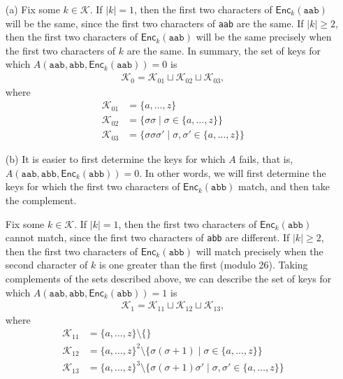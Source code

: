 \documentclass[12pt]{article}
\numberwithin{equation}{section}
\theoremstyle{plain}
\newcommand{\set}[1]{\{ #1 \}}
\newcommand{\keys}{\mathcal{K}}
\newcommand{\algo}[1]{\mathsf{#1}}
\newcommand{\enc}{\algo{Enc}}
\begin{document}
\begin{enumerate}
    \item[(a)] Fix some $k \in \keys$.
    If $|k| = 1$,
    then the first two characters of $\enc_{k}(\texttt{aab})$ will be the same,
    since the first two characters of \texttt{aab} are the same.
    If $|k| \geq 2$,
    then the first two characters of $\enc_{k}(\texttt{aab})$ will be the same
    precisely when the first two characters of $k$ are the same.
    In summary, the set of keys for which $A(\texttt{aab}, \texttt{abb}, \enc_{k}(\texttt{aab})) = 0$ is
    \begin{gather*}
        \keys_0 = \keys_{01} \sqcup \keys_{02} \sqcup \keys_{03},
    \end{gather*}
    where
    \begin{align*}
        \keys_{01} &= \set{ a, \ldots, z }\\
        \keys_{02} &= \set{ \sigma \sigma \mid \sigma \in \set{ a, \ldots, z } }\\
        \keys_{03} &= \set{ \sigma \sigma \sigma' \mid \sigma, \sigma' \in \set{ a, \ldots, z } }
    \end{align*}

    \item[(b)] It is easier to first determine the keys for which $A$ fails,
    that is, $A(\texttt{aab}, \texttt{abb}, \enc_{k}(\texttt{abb})) = 0$.
    In other words, we will first determine the keys for which
    the first two characters of $\enc_{k}(\texttt{abb})$ match,
    and then take the complement.

    Fix some $k \in \keys$.
    If $|k| = 1$,
    then the first two characters of $\enc_{k}(\texttt{abb})$ cannot match,
    since the first two characters of \texttt{abb} are different.
    If $|k| \geq 2$,
    then the first two characters of $\enc_{k}(\texttt{abb})$ will match
    precisely when the second character of $k$ is one greater than the first (modulo 26).
    Taking complements of the sets described above,
    we can describe the set of keys for which $A(\texttt{aab}, \texttt{abb}, \enc_{k}(\texttt{abb})) = 1$ is
    \begin{gather*}
        \keys_1 = \keys_{11} \sqcup \keys_{12} \sqcup \keys_{13},
    \end{gather*}
    where
    \begin{align*}
        \keys_{11} &= \set{ a, \ldots, z } \setminus \set{ }\\
        \keys_{12} &= \set{ a, \ldots, z }^2 \setminus \set{ \sigma(\sigma+1) \mid \sigma \in \set{ a, \ldots, z } }\\
        \keys_{13} &= \set{ a, \ldots, z }^3 \setminus \set{ \sigma(\sigma+1)\sigma' \mid \sigma, \sigma' \in \set{ a, \ldots, z } }
    \end{align*}
\end{enumerate}
\end{document}
